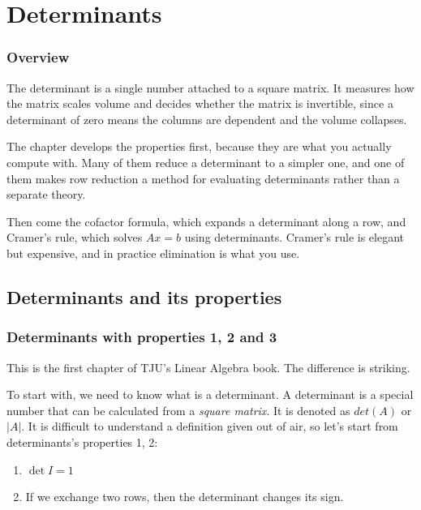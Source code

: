 \documentclass[10pt,a4paper,oneside,numbers=noenddot]{scrbook}
\theoremstyle{ctplain}
\theoremstyle{ctresult}
\begin{document}
\chapter{Determinants}

\subsection*{Overview}

The determinant is a single number attached to a square matrix. It measures how the matrix
scales volume and decides whether the matrix is invertible, since a determinant of zero
means the columns are dependent and the volume collapses.

The chapter develops the properties first, because they are what you actually compute with.
Many of them reduce a determinant to a simpler one, and one of them makes row reduction a
method for evaluating determinants rather than a separate theory.

Then come the cofactor formula, which expands a determinant along a row, and Cramer's rule,
which solves $Ax = b$ using determinants. Cramer's rule is elegant but expensive, and in
practice elimination is what you use.


\section{Determinants and its properties}
\subsection{Determinants with properties 1, 2 and 3}

This is the first chapter of TJU's Linear Algebra book. The difference is striking.

To start with, we need to know what is a determinant. A determinant is a special number
that can be calculated from a \emph{square matrix}. It is denoted as $det(A)$ or
$|A|$. It is difficult to understand a definition given out of air, so let's start from
determinants's properties 1, 2:
\begin{enumerate}[label=(\arabic*)]
  \item $\det I = 1$
  \item If we exchange two rows, then the determinant changes its sign.
\end{enumerate}
\end{document}
